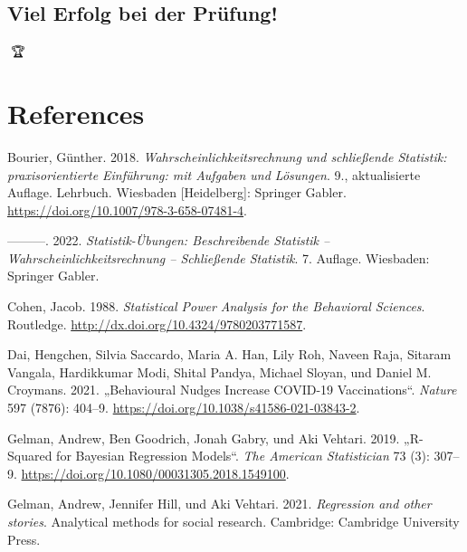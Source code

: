 \documentclass[
  a4paper,
  DIV=11]{scrreprt}
\newlength{\cslhangindent}
\newlength{\cslentryspacingunit} %
\newenvironment{CSLReferences}[2] %
 {%
  \setlength{\parindent}{0pt}
  \ifodd #1
  \let\oldpar\par
  \def\par{\hangindent=\cslhangindent\oldpar}
  \fi
  \setlength{\parskip}{#2\cslentryspacingunit}
 }%
 {}
\theoremstyle{definition}
\theoremstyle{remark}
\begin{document}
\hypertarget{viel-erfolg-bei-der-pruxfcfung}{%
\section{Viel Erfolg bei der
Prüfung!}\label{viel-erfolg-bei-der-pruxfcfung}}

🥳🏆


\hypertarget{references}{%
\chapter*{References}\label{references}}

\hypertarget{refs}{}
\begin{CSLReferences}{1}{0}
\leavevmode{}%
Bourier, Günther. 2018. \emph{Wahrscheinlichkeitsrechnung und
schließende Statistik: praxisorientierte Einführung: mit Aufgaben und
Lösungen}. 9., aktualisierte Auflage. Lehrbuch. Wiesbaden
{[}Heidelberg{]}: Springer Gabler.
\url{https://doi.org/10.1007/978-3-658-07481-4}.

\leavevmode{}%
---------. 2022. \emph{Statistik-Übungen: Beschreibende Statistik --
Wahrscheinlichkeitsrechnung -- Schließende Statistik}. 7. Auflage.
Wiesbaden: Springer Gabler.

\leavevmode{}%
Cohen, Jacob. 1988. \emph{Statistical Power Analysis for the Behavioral
Sciences}. Routledge. \url{http://dx.doi.org/10.4324/9780203771587}.

\leavevmode{}%
Dai, Hengchen, Silvia Saccardo, Maria A. Han, Lily Roh, Naveen Raja,
Sitaram Vangala, Hardikkumar Modi, Shital Pandya, Michael Sloyan, und
Daniel M. Croymans. 2021. {„Behavioural Nudges Increase {COVID}-19
Vaccinations``}. \emph{Nature} 597 (7876): 404--9.
\url{https://doi.org/10.1038/s41586-021-03843-2}.

\leavevmode{}%
Gelman, Andrew, Ben Goodrich, Jonah Gabry, und Aki Vehtari. 2019.
{„R-Squared for Bayesian Regression Models``}. \emph{The American
Statistician} 73 (3): 307--9.
\url{https://doi.org/10.1080/00031305.2018.1549100}.

\leavevmode{}%
Gelman, Andrew, Jennifer Hill, und Aki Vehtari. 2021. \emph{Regression
and other stories}. Analytical methods for social research. Cambridge:
Cambridge University Press.


\end{CSLReferences}
\end{document}

